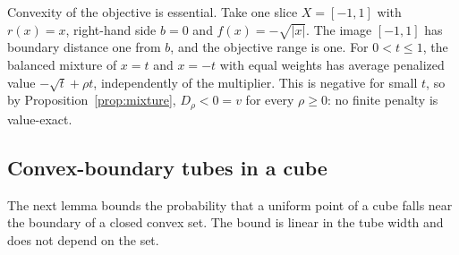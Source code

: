 Convexity of the objective is essential. Take one slice $X=[-1,1]$ with
$r(x)=x$, right-hand side $b=0$ and $f(x)=-\sqrt{|x|}$. The image
$[-1,1]$ has boundary distance one from $b$, and the objective range is
one. For $0<t\le1$, the balanced mixture of $x=t$ and $x=-t$ with equal
weights has average penalized value $-\sqrt t+\rho t$, independently of
the multiplier. This is negative for small $t$, so by
Proposition~\ref{prop:mixture}, $D_\rho<0=v$ for every $\rho\ge0$: no
finite penalty is value-exact.

\subsection{Convex-boundary tubes in a cube}
The next lemma bounds the probability that a uniform point of a cube
falls near the boundary of a closed convex set. The bound is linear in
the tube width and does not depend on the set.

